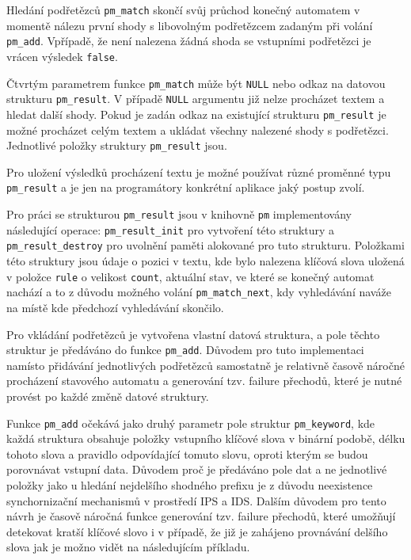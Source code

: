 Hledání podřetězců \texttt{pm\_match} skončí svůj průchod konečný automatem v momentě nálezu první shody
s libovolným podřetězcem zadaným při volání \texttt{pm\_add}. Vpřípadě, že není nalezena žádná shoda
se vstupními podřetězci je vrácen výsledek \texttt{false}.

Čtvrtým parametrem funkce \texttt{pm\_match} může být \texttt{NULL} nebo odkaz na datovou strukturu
\texttt{pm\_result}. V případě \texttt{NULL} argumentu již nelze procházet textem a hledat další shody.
Pokud je zadán odkaz na existující strukturu \texttt{pm\_result} je možné procházet celým textem a ukládat
všechny nalezené shody s podřetězci. Jednotlivé položky struktury \texttt{pm\_result} jsou.

Pro uložení výsledků procházení textu je možné používat různé proměnné typu \texttt{pm\_result}
a je jen na programátory konkrétní aplikace jaký postup zvolí.

Pro práci se strukturou \texttt{pm\_result} jsou v knihovně \texttt{pm} implementovány následující operace:
\texttt{pm\_result\_init} pro vytvoření této struktury a \texttt{pm\_result\_destroy} pro
uvolnění paměti alokované pro tuto strukturu. Položkami této struktury jsou údaje o pozici v textu,
kde bylo nalezena klíčová slova uložená v položce \texttt{rule} o velikost \texttt{count},
aktuální stav, ve které se konečný automat nachází a to z důvodu možného volání
\texttt{pm\_match\_next}, kdy vyhledávání naváže na místě kde předchozí vyhledávání skončilo.

Pro vkládání podřetězců je vytvořena vlastní datová struktura, a pole těchto struktur je předáváno do funkce
\texttt{pm\_add}. Důvodem pro tuto implementaci namísto přidávání jednotlivých podřetězců samostatně
je relativně časově náročné procházení stavového automatu a generování tzv. failure přechodů,
které je nutné provést po každé změně datové struktury.

Funkce \texttt{pm\_add} očekává jako druhý parametr pole struktur \texttt{pm\_keyword}, kde každá struktura
obsahuje položky vstupního klíčové slova v binární podobě, délku tohoto slova a pravidlo odpovídající tomuto slovu, oproti kterým se budou porovnávat vstupní data. Důvodem proč je předáváno pole dat a ne jednotlivé položky
jako u hledání nejdelšího shodného prefixu je z důvodu neexistence synchornizační mechanismů
v prostředí IPS a IDS. Dalším důvodem pro tento návrh je časově náročná funkce generování
tzv. failure přechodů, které umožňují detekovat kratší klíčové slovo i v případě, že již je
zahájeno provnávání delšího slova jak je možno vidět na následujícím příkladu.

